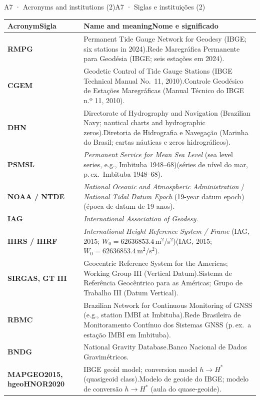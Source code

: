 \documentclass[aspectratio=169,11pt]{beamer}
\newcommand{\tr}[2]{\ifEN#2\else#1\fi}
\begin{document}
\begin{frame}{\tr{A7 · Siglas e instituições (2)}{A7 · Acronyms and institutions (2)}}
  \tiny
  \renewcommand{\arraystretch}{1.2}
  \begin{tabular}{@{}lL{10.2cm}@{}}
    \toprule
    \textbf{\tr{Sigla}{Acronym}} & \textbf{\tr{Nome e significado}{Name and meaning}} \\
    \midrule
    \textbf{RMPG} & \tr{Rede Maregráfica Permanente para Geodésia (IBGE; seis estações em 2024).}{Permanent Tide Gauge Network for Geodesy (IBGE; six stations in 2024).} \\
    \textbf{CGEM} & \tr{Controle Geodésico de Estações Maregráficas (Manual Técnico do IBGE n.º 11, 2010).}{Geodetic Control of Tide Gauge Stations (IBGE Technical Manual No.~11, 2010).} \\
    \textbf{DHN} & \tr{Diretoria de Hidrografia e Navegação (Marinha do Brasil; cartas náuticas e zeros hidrográficos).}{Directorate of Hydrography and Navigation (Brazilian Navy; nautical charts and hydrographic zeros).} \\
    \textbf{PSMSL} & \emph{Permanent Service for Mean Sea Level} \tr{(séries de nível do mar, p.\,ex.\ Imbituba 1948--68)}{(sea level series, e.g., Imbituba 1948--68)}. \\
    \textbf{NOAA / NTDE} & \emph{National Oceanic and Atmospheric Administration} / \emph{National Tidal Datum Epoch} \tr{(época de datum de \num{19} anos)}{(\num{19}-year datum epoch)}. \\
    \textbf{IAG} & \emph{International Association of Geodesy}. \\
    \textbf{IHRS / IHRF} & \emph{International Height Reference System / Frame} \tr{(IAG, 2015; $W_0=\num{62636853.4}$\,m$^{2}$/s$^{2}$)}{(IAG, 2015; $W_0=\num{62636853.4}$\,m$^{2}$/s$^{2}$)}. \\
    \textbf{SIRGAS, GT III} & \tr{Sistema de Referência Geocêntrico para as Américas; Grupo de Trabalho III (Datum Vertical).}{Geocentric Reference System for the Americas; Working Group III (Vertical Datum).} \\
    \textbf{RBMC} & \tr{Rede Brasileira de Monitoramento Contínuo dos Sistemas GNSS (p.\,ex.\ a estação IMBI em Imbituba).}{Brazilian Network for Continuous Monitoring of GNSS (e.g., station IMBI at Imbituba).} \\
    \textbf{BNDG} & \tr{Banco Nacional de Dados Gravimétricos.}{National Gravity Database.} \\
    \textbf{MAPGEO2015, hgeoHNOR2020} & \tr{Modelo de geoide do IBGE; modelo de conversão $h\to H^{*}$ (aula do quase-geoide).}{IBGE geoid model; conversion model $h\to H^{*}$ (quasigeoid class).} \\
    \bottomrule
  \end{tabular}
\end{frame}
\end{document}
